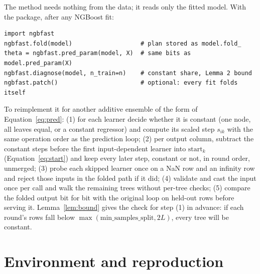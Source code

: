 \documentclass{article}
\begin{document}
The method needs nothing from the data; it reads only the fitted model. With the package, after any NGBoost fit:
\begin{verbatim}
import ngbfast
ngbfast.fold(model)                   # plan stored as model.fold_
theta = ngbfast.pred_param(model, X)  # same bits as model.pred_param(X)
ngbfast.diagnose(model, n_train=n)    # constant share, Lemma 2 bound
ngbfast.patch()                       # optional: every fit folds itself
\end{verbatim}
To reimplement it for another additive ensemble of the form of Equation~\eqref{eq:pred}: (1) for each learner decide whether it is constant (one node, all leaves equal, or a constant regressor) and compute its scaled step $s_{ik}$ with the same operation order as the prediction loop; (2) per output column, subtract the constant steps before the first input-dependent learner into $\text{start}_k$ (Equation~\eqref{eq:start}) and keep every later step, constant or not, in round order, unmerged; (3) probe each skipped learner once on a NaN row and an infinity row and reject those inputs in the folded path if it did; (4) validate and cast the input once per call and walk the remaining trees without per-tree checks; (5) compare the folded output bit for bit with the original loop on held-out rows before serving it. Lemma~\ref{lem:bound} gives the check for step (1) in advance: if each round's rows fall below $\max(\text{min\_samples\_split}, 2L)$, every tree will be constant.

\section{Environment and reproduction}
\label{app:env}
\end{document}
